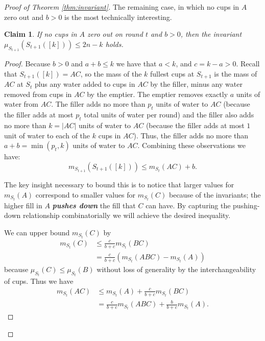 \documentclass[twocolumn]{article}[10pt]
\newcommand{\defn}[1]{{\textit{\textbf{\boldmath #1}}}\xspace}
\newtheorem{clm}{Claim}
\begin{document}
\begin{proof}[Proof of Theorem \ref{thm:invariant}]
The remaining case, in which no cups in $A$ zero out and $b > 0$ is the most technically interesting.
\begin{clm}
  If no cups in $A$ zero out on round $t$ and $b > 0$, then the invariant
  $\mu_{S_{t+1}}(S_{t+1}([k])) \le 2n-k$ holds.
\end{clm}
\begin{proof}
Because $b>0$ and $a+b \le k$ we have that $a
< k$, and $c = k-a > 0$. Recall that $S_{t+1}([k]) = AC$, so the mass of the
$k$ fullest cups at $S_{t+1}$ is the mass of $AC$ at $S_t$ plus any water added
to cups in $AC$ by the filler, minus any water removed from cups in $AC$ by the
emptier. The emptier removes exactly $a$ units of water from $AC$.
The filler adds no more than $p_t$ units of water to $AC$ (because the filler
adds at most $p_t$ total units of water per round) and the filler also
adds no more than $k = |AC|$ units of water to $AC$ (because the filler adds
at most $1$ unit of water to each of the $k$ cups in $AC$).
Thus, the filler adds no more than $a+b = \min(p_t, k)$ units of water to $AC$.
Combining these observations we have:
\begin{equation}
m_{S_{t+1}}(S_{t+1}([k])) \le m_{S_t}(AC) + b.
\label{eq:emptiereptiessomestufffillerfillssomestuff}
\end{equation}

The key insight necessary to bound this is to notice that larger values for
$m_{S_t}(A)$ correspond to smaller values for $m_{S_t}(C)$ because of the
invariants; the higher fill in $A$ \defn{pushes down} the fill that $C$ can
have. By capturing the pushing-down relationship combinatorially we will achieve the desired inequality.

We can upper bound $m_{S_t}(C)$ by 
\begin{align*}
m_{S_t}(C) & \le \frac{c}{b+c}m_{S_t}(BC) \\
&= \frac{c}{b+c}(m_{S_t}(ABC) - m_{S_t}(A))
\end{align*}
 because
$\mu_{S_t}(C) \le \mu_{S_t}(B)$ without loss of generality by the
interchangeability of cups.
Thus we have 
\begin{align}
  m_{S_t}(AC) &\le m_{S_t}(A) + \frac{c}{b+c}m_{S_t}(BC)\label{eqn:BCdiscounted}\\
  &= \frac{c}{b+c}m_{S_t}(ABC) + \frac{b}{b+c}m_{S_t}(A)\label{eqn:redistributeA}.
\end{align}


\end{proof}
\end{proof}
\end{document}
